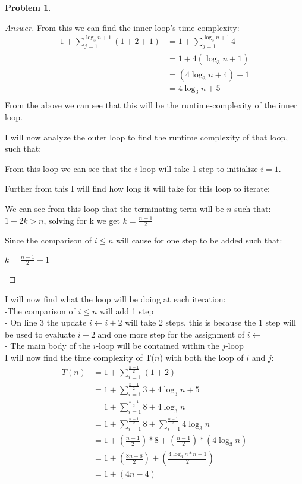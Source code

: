 \documentclass[11pt]{article}
\theoremstyle{definition}
\theoremstyle{definition}
\newtheorem{required}{Problem}
\theoremstyle{definition}
\begin{document}
\begin{required}
\begin{proof}[Answer]
From this we can find the inner loop's time complexity: \\
\begin{align*}
1 + \sum_{j=1}^{\log_3 n + 1} (1 + 2 + 1) &= 1 + \sum_{j=1}^{\log_3 n + 1}  4 \\
&= 1 + 4(\log_3 n + 1) \\
&= (4\log_3 n + 4) + 1 \\
&= 4\log_3 n + 5 \\
\end{align*}
From the above we can see that this will be the runtime-complexity of the inner loop.

I will now analyze the outer loop to find the runtime complexity of that loop, such that:\\
\begin{center}
From this loop we can see that the $i$-loop will take 1 step to initialize $i=1$. \\
\end{center}
Further from this I will find how long it will take for this loop to iterate: \\
\begin{center}
We can see from this loop that the terminating term will be $n$ such that: \\
$1+2k > n$, solving for k we get $k = \frac{n-1}{2}$
\end{center}
Since the comparison of $i\leq n$ will cause for one step to be added such that: \\
\begin{center}
$k = \frac{n-1}{2} + 1$
\end{center}
\end{proof}

I will now find what the loop will be doing at each iteration: \\
\indent -The comparison of $i\leq n$ will add 1 step \\
\indent - On line 3 the update $i \leftarrow i + 2$ will take 2 steps, this is because the 1 step will be used to evaluate $i + 2$ and \indent one more step for the assignment of $i \leftarrow$ \\
\indent - The main body of the $i$-loop will be contained within the $j$-loop \\
I will now find the time complexity of T($n$) with both the loop of $i$ and $j$: \\
\begin{align*}
T(n)&= 1 + \sum_{i=1}^{\frac{n-1}{2}} (1 + 2 )  \\
&= 1 + \sum_{i=1}^{\frac{n-1}{2}} 3 +  4\log_3 n + 5\\
&= 1 + \sum_{i=1}^{\frac{n-1}{2}} 8 + 4\log_3 n \\
&= 1 + \sum_{i=1}^{\frac{n-1}{2}} 8 + \sum_{i=1}^{\frac{n-1}{2}} 4\log_3 n \\
&= 1 + (\frac{n-1}{2})*8 + (\frac{n-1}{2})*(4\log_3 n ) \\
&= 1+(\frac{8n-8}{2}) + (\frac{4\log_3 n*n-1}{2}) \\
&= 1 + (4n-4) 
\end{align*}
\end{required}
\end{document}
